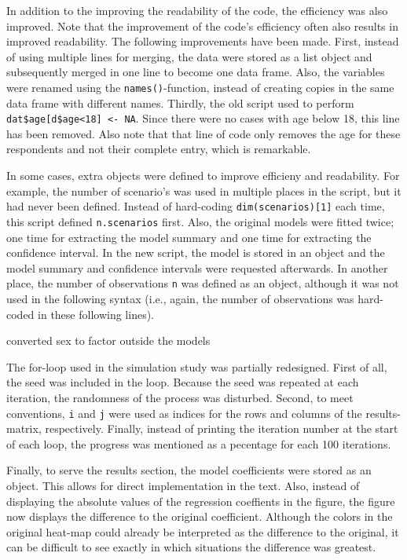 \documentclass[
  letterpaper,
  DIV=11,
  numbers=noendperiod]{scrartcl}
\begin{document}
In addition to the improving the readability of the code, the efficiency
was also improved. Note that the improvement of the code's efficiency
often also results in improved readability. The following improvements
have been made. First, instead of using multiple lines for merging, the
data were stored as a list object and subsequently merged in one line to
become one data frame. Also, the variables were renamed using the
\texttt{names()}-function, instead of creating copies in the same data
frame with different names. Thirdly, the old script used to perform
\texttt{dat\$age{[}d\$age\textless{}18{]}\ \textless{}-\ NA}. Since
there were no cases with age below 18, this line has been removed. Also
note that that line of code only removes the age for these respondents
and not their complete entry, which is remarkable.

In some cases, extra objects were defined to improve efficieny and
readability. For example, the number of scenario's was used in multiple
places in the script, but it had never been defined. Instead of
hard-coding \texttt{dim(scenarios){[}1{]}} each time, this script
defined \texttt{n.scenarios} first. Also, the original models were
fitted twice; one time for extracting the model summary and one time for
extracting the confidence interval. In the new script, the model is
stored in an object and the model summary and confidence intervals were
requested afterwards. In another place, the number of observations
\texttt{n} was defined as an object, although it was not used in the
following syntax (i.e., again, the number of observations was hard-coded
in these following lines).

converted sex to factor outside the models

The for-loop used in the simulation study was partially redesigned.
First of all, the seed was included in the loop. Because the seed was
repeated at each iteration, the randomness of the process was disturbed.
Second, to meet conventions, \texttt{i} and \texttt{j} were used as
indices for the rows and columns of the results-matrix, respectively.
Finally, instead of printing the iteration number at the start of each
loop, the progress was mentioned as a pecentage for each 100 iterations.

Finally, to serve the results section, the model coefficients were
stored as an object. This allows for direct implementation in the text.
Also, instead of displaying the absolute values of the regression
coeffients in the figure, the figure now displays the difference to the
original coefficient. Although the colors in the original heat-map could
already be interpreted as the difference to the original, it can be
difficult to see exactly in which situations the difference was
greatest.
\end{document}
